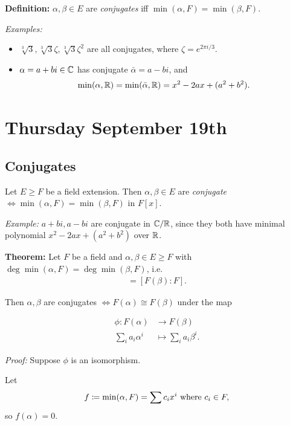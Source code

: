 \textbf{Definition:} \(\alpha, \beta \in E\) are \emph{conjugates} iff
\(\min(\alpha, F) = \min(\beta, F)\).

\emph{Examples:}

\begin{itemize}
\item
  \(\sqrt[3]{3}, \sqrt[3]{3}\zeta, \sqrt[3]{3}\zeta^2\) are all
  conjugates, where \(\zeta = e^{2\pi i/3}\).
\item
  \(\alpha = a+bi \in {\mathbb{C}}\) has conjugate \(\bar \alpha = a-bi\), and
  \begin{align*}
  \min(\alpha, {\mathbb{R}}) = \min(\bar \alpha, {\mathbb{R}}) = x^2 - 2ax + (a^2 + b^2)
  .\end{align*}
\end{itemize}

\hypertarget{thursday-september-19th}{%
\section{Thursday September 19th}\label{thursday-september-19th}}

\hypertarget{conjugates}{%
\subsection{Conjugates}\label{conjugates}}

Let \(E \geq F\) be a field extension. Then \(\alpha,\beta \in E\) are
\emph{conjugate} \(\iff \min(\alpha, F) = \min(\beta, F)\) in \(F[x]\).

\emph{Example:} \(a + bi, a-bi\) are conjugate in \({\mathbb{C}}/{\mathbb{R}}\), since
they both have minimal polynomial \(x^2 - 2ax + (a^2 + b^2)\) over
\({\mathbb{R}}\).

\textbf{Theorem:} Let \(F\) be a field and
\(\alpha, \beta \in E \geq F\) with
\(\deg \min (\alpha, F) = \deg \min(\beta, F)\), i.e.
\begin{align*}
[F(\alpha): F] = [F(\beta): F]
.\end{align*}

Then \(\alpha, \beta\) are conjugates \(\iff F(\alpha) \cong F(\beta)\)
under the map

\begin{align*}
\phi: F(\alpha) &\to F(\beta)\\
\sum_i a_i \alpha^i &\mapsto \sum_i a_i \beta^i
.\end{align*}

\emph{Proof:} Suppose \(\phi\) is an isomorphism.

Let
\begin{align*}
f \coloneqq \min (\alpha, F) = \sum c_i x^i
\text{ where }
c_i \in F
,\end{align*} so \(f(\alpha) = 0\).

